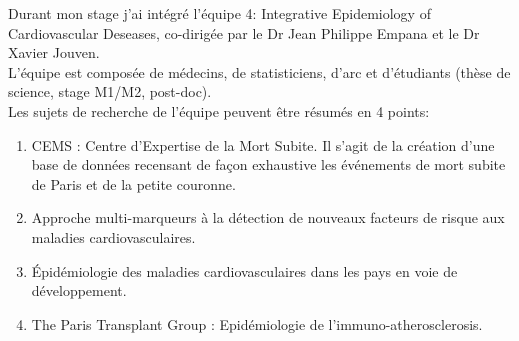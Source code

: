 \documentclass{book}
\begin{document}
\noindent
Durant mon stage j'ai intégré l'équipe 4: Integrative Epidemiology of Cardiovascular Deseases, co-dirigée par le Dr Jean Philippe Empana et le Dr Xavier Jouven.\\
L'équipe est composée de médecins, de statisticiens, d'arc et d'étudiants (thèse de science, stage M1/M2, post-doc).\\

\noindent
Les sujets de recherche de l'équipe peuvent être résumés en 4 points:
\begin{enumerate}
\item CEMS : Centre d'Expertise de la Mort Subite. Il s'agit de la création d'une base de données recensant de façon exhaustive les événements de mort subite de Paris et de la petite couronne.\\
\item Approche multi-marqueurs à la détection de nouveaux facteurs de risque aux maladies cardiovasculaires.\\
\item Épidémiologie des maladies cardiovasculaires dans les pays en voie de développement.\\
\item The Paris Transplant Group : Epidémiologie de l'immuno-atherosclerosis.\\
\end{enumerate}




\end{document}
